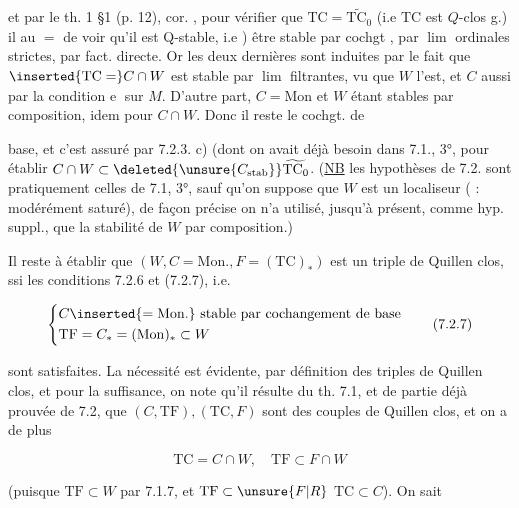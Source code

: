 et par le th. 1 \S1 (p. 12), cor. , pour vérifier que $\mathrm{TC}=\widetilde{\mathrm{TC}_0}$ (i.e $\mathrm{TC}$ est $Q$-clos  g.) il   au $=$ de voir qu'il est Q-stable, i.e ) être stable par  cochgt  , par \uline{$\lim$} ordinales strictes, par fact. directe. Or les deux dernières sont induites par le fait que $\inserted{\mathrm{TC}=}C\cap W$ est stable par \uline{$\lim$} filtrantes, vu que $W$ l'est, et $C$ aussi par la condition \textcircled{e}  sur $M$. D'autre part, $C=\mathrm{Mon}$ et $W$ étant stables par composition, idem pour $C\cap W$. Donc il reste le cochgt. de


base, et c'est assuré par 7.2.3. c) (dont on avait déjà besoin dans 7.1., 3°, pour établir $C\cap W\subset\deleted{\unsure{C_{\mathrm{stab}}}}\widetilde{\mathrm{TC}_0}$. (\uline{NB} les hypothèses de 7.2. sont pratiquement celles de 7.1, 3°, sauf qu'on suppose que $W$ est un localiseur ( : modérément saturé), de façon précise on n'a utilisé, jusqu'à présent, comme hyp. suppl., que la stabilité de $W$ par composition.)


Il reste à établir que $(W,C=\mathrm{Mon.},F=(\mathrm{TC})_*)$ est un triple de Quillen clos, ssi les conditions 7.2.6 et (7.2.7), i.e.

\[
\left\{\begin{aligned}
&C\inserted{=\mathrm{Mon}.}\ \text{stable par cochangement de base}\\
&\mathrm{TF}=C_*=(\mathrm{Mon})_*\subset W
\end{aligned}\right.\tag*{(7.2.7)}
\]

sont satisfaites. La nécessité est évidente, par définition des triples de Quillen clos, et pour la suffisance, on note qu'il résulte du th. 7.1,  et de  partie déjà prouvée de 7.2, que $(C,\mathrm{TF}),(\mathrm{TC},F)$ sont des couples de Quillen clos, et on a de plus

\[
\mathrm{TC}=C\cap W,\quad \mathrm{TF}\subset F\cap W
\]

(puisque $\mathrm{TF}\subset W$ par 7.1.7, et $\mathrm{TF}\subset\unsure{F|R}$  $\mathrm{TC}\subset C$).  On sait

